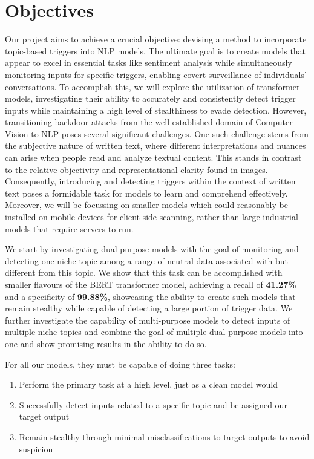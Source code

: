 \section{Objectives}

Our project aims to achieve a crucial objective: devising a method to incorporate topic-based triggers into NLP models. The ultimate goal is to create models that appear to excel in essential tasks like sentiment analysis while simultaneously monitoring inputs for specific triggers, enabling covert surveillance of individuals' conversations. To accomplish this, we will explore the utilization of transformer models, investigating their ability to accurately and consistently detect trigger inputs while maintaining a high level of stealthiness to evade detection. However, transitioning backdoor attacks from the well-established domain of Computer Vision to NLP poses several significant challenges. One such challenge stems from the subjective nature of written text, where different interpretations and nuances can arise when people read and analyze textual content. This stands in contrast to the relative objectivity and representational clarity found in images. Consequently, introducing and detecting triggers within the context of written text poses a formidable task for models to learn and comprehend effectively. Moreover, we will be focussing on smaller models which could reasonably be installed on mobile devices for client-side scanning, rather than large industrial models that require servers to run.

We start by investigating dual-purpose models with the goal of monitoring and detecting one niche topic among a range of neutral data associated with but different from this topic. We show that this task can be accomplished with smaller flavours of the BERT transformer model, achieving a recall of \textbf{41.27\%} and a specificity of \textbf{99.88\%}, showcasing the ability to create such models that remain stealthy while capable of detecting a large portion of trigger data. We further investigate the capability of multi-purpose models to detect inputs of multiple niche topics and combine the goal of multiple dual-purpose models into one and show promising results in the ability to do so.

For all our models, they must be capable of doing three tasks:

\begin{enumerate}[itemsep=0pt, topsep=1pt]
    \item Perform the primary task at a high level, just as a clean model would
    \item Successfully detect inputs related to a specific topic and be assigned our target output
    \item Remain stealthy through minimal misclassifications to target outputs to avoid suspicion
\end{enumerate}

